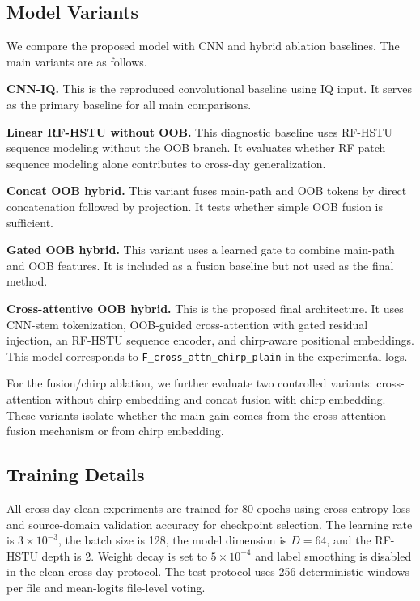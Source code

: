\subsection{Model Variants}

We compare the proposed model with CNN and hybrid ablation baselines. The main variants are as follows.

\textbf{CNN-IQ.} This is the reproduced convolutional baseline using IQ input. It serves as the primary baseline for all main comparisons.

\textbf{Linear RF-HSTU without OOB.} This diagnostic baseline uses RF-HSTU sequence modeling without the OOB branch. It evaluates whether RF patch sequence modeling alone contributes to cross-day generalization.

\textbf{Concat OOB hybrid.} This variant fuses main-path and OOB tokens by direct concatenation followed by projection. It tests whether simple OOB fusion is sufficient.

\textbf{Gated OOB hybrid.} This variant uses a learned gate to combine main-path and OOB features. It is included as a fusion baseline but not used as the final method.

\textbf{Cross-attentive OOB hybrid.} This is the proposed final architecture. It uses CNN-stem tokenization, OOB-guided cross-attention with gated residual injection, an RF-HSTU sequence encoder, and chirp-aware positional embeddings. This model corresponds to \texttt{F\_cross\_attn\_chirp\_plain} in the experimental logs.

For the fusion/chirp ablation, we further evaluate two controlled variants: cross-attention without chirp embedding and concat fusion with chirp embedding. These variants isolate whether the main gain comes from the cross-attention fusion mechanism or from chirp embedding.

\subsection{Training Details}

All cross-day clean experiments are trained for 80 epochs using cross-entropy loss and source-domain validation accuracy for checkpoint selection. The learning rate is $3\times10^{-3}$, the batch size is 128, the model dimension is $D=64$, and the RF-HSTU depth is 2. Weight decay is set to $5\times10^{-4}$ and label smoothing is disabled in the clean cross-day protocol. The test protocol uses 256 deterministic windows per file and mean-logits file-level voting.

